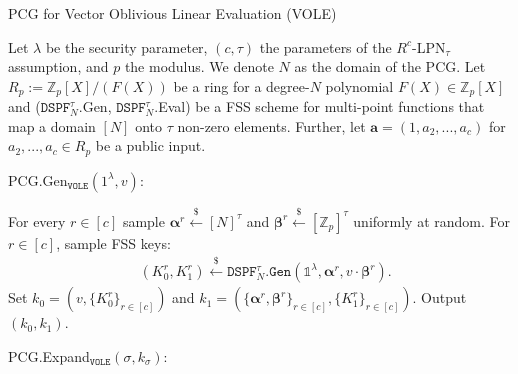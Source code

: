 \begin{specialconstruction}{PCG for Vector Oblivious Linear Evaluation (VOLE)}
\label{construction:PCGforVOLEImpl}

\vspace{1em}

Let $\lambda$ be the security parameter, $(c,\tau)$ the parameters of the $R^c$-LPN$_\tau$ assumption, and $p$ the modulus. We denote $N$ as the domain of the PCG. Let $R_p:=\mathbb{Z}_{p}[X]/(F(X))$ be a ring for a degree-$N$ polynomial $F(X) \in \mathbb{Z}_{p}[X]$ and ($\texttt{DSPF}^{\tau}_{N}$.Gen, $\texttt{DSPF}^{\tau}_{N}$.Eval) be a FSS scheme for multi-point functions that map a domain $[N]$ onto $\tau$ non-zero elements. Further, let $\boldsymbol{a} = (1, a_2, ..., a_c)$ for $a_2, ...,a_c \in R_p$ be a public input.

\vspace{1em}

PCG.Gen$_{\texttt{VOLE}}(1^\lambda, v)$:

\begin{algorithmic}[1]
\State For every $r \in [c]$ sample $\boldsymbol{\alpha}^{r} \stackrel{\$}{\leftarrow}[N]^{\tau}$ and $\boldsymbol{\beta}^{r} \stackrel{\$}{\leftarrow} [\mathbb{Z}_{p}]^{\tau}$ uniformly at random.
\State For $r \in [c]$, sample FSS keys:
\begin{align*}
& \left(K_{0}^{r}, K_{1}^{r}\right) \stackrel{\$}{\leftarrow} \texttt{DSPF}^{\tau}_{N}\texttt{.Gen}\left(\mathds{1}^{\lambda}, \boldsymbol{\alpha}^{r}, v \cdot \boldsymbol{\beta}^{r}\right).
\end{align*}
\State Set $k_0 = (v, \{K_0^{r}\}_{r\in[c]})$ and $k_1 = (\{\boldsymbol{\alpha}^r, \boldsymbol{\beta}^r\}_{r\in[c]}, \{K_1^{r}\}_{r\in[c]})$.
\State Output $(k_0, k_1)$.
\end{algorithmic}

\vspace{1em} %

PCG.Expand$_{\texttt{VOLE}}(\sigma, k_\sigma)$:


\end{specialconstruction}
